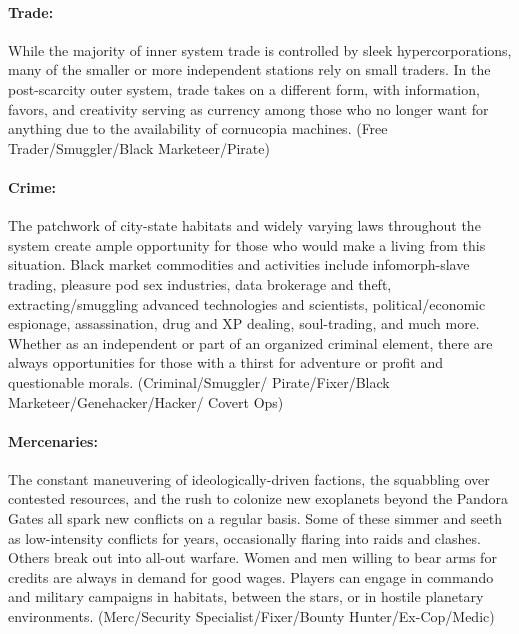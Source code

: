 \paragraph{Trade:} While the majority of inner system trade is controlled by sleek hypercorporations, many of the smaller or more independent stations rely on small traders. In the post-scarcity outer system, trade takes on a different form, with information, favors, and creativity serving as currency among those who no longer want for anything due to the availability of cornucopia machines. (Free Trader/Smuggler/Black Marketeer/Pirate) 

\paragraph{Crime:} The patchwork of city-state habitats and widely varying laws throughout the system create ample opportunity for those who would make a living from this situation. Black market commodities and activities include infomorph-slave trading, pleasure pod sex industries, data brokerage and theft, extracting/smuggling advanced technologies and scientists, political/economic espionage, assassination, drug and XP dealing, soul-trading, and much more. Whether as an independent or part of an organized criminal element, there are always opportunities for those with a thirst for adventure or profit and questionable morals. (Criminal/Smuggler/ Pirate/Fixer/Black Marketeer/Genehacker/Hacker/ Covert Ops) 

\paragraph{Mercenaries:} The constant maneuvering of ideologically-driven factions, the squabbling over contested resources, and the rush to colonize new exoplanets beyond the Pandora Gates all spark new conflicts on a regular basis. Some of these simmer and seeth as low-intensity conflicts for years, occasionally flaring into raids and clashes. Others break out into all-out warfare. Women and men willing to bear arms for credits are always in demand for good wages. Players can engage in commando and military campaigns in habitats, between the stars, or in hostile planetary environments. (Merc/Security Specialist/Fixer/Bounty Hunter/Ex-Cop/Medic) 


